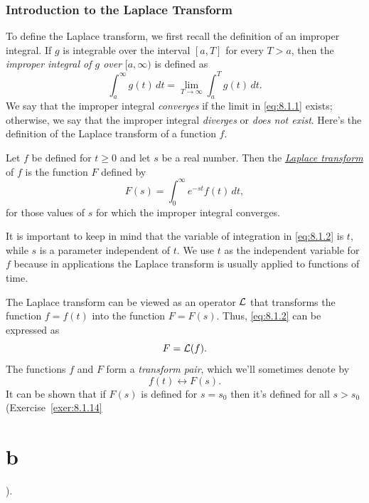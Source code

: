 \section{Introduction to the Laplace Transform}

\noindent
{}

\noindent
To define the Laplace transform, we first recall the definition of an improper integral. If $g$ is
integrable over the interval $[a,T]$ for every $T>a$, then the {\color{blue}\it improper integral of
$g$ over\/} $[a,\infty)$ is defined as
\begin{equation}
  \label{eq:8.1.1}\int^{\infty}_{a}g(t)\,dt=\lim_{T\to\infty}\int^{T}_{a}g(t)\,dt.
\end{equation}
We say that the improper integral {\color{blue}\it converges\/} if the limit in \eqref{eq:8.1.1}
exists; otherwise, we say that the improper integral {\color{blue}\it diverges\/} or
{\color{blue}\it does not exist\/}. Here's the definition of the Laplace transform of a function
$f$.

\begin{definition}
  \color{blue}
  \label{thmtype:8.1.1}\rm Let $f$ be defined for $t\ge0$ and let $s$ be a real number. Then the
  \href{https://mathshistory.st-andrews.ac.uk/Biographies/Laplace/}{\color{blue}
  \it Laplace transform} of $f$ is the function $F$ defined by
  \begin{equation}
    \label{eq:8.1.2}F(s)=\int_{0}^{\infty}e^{-st}f(t)\,dt,
  \end{equation}
  for those values of $s$ for which the improper integral converges.
\end{definition}

It is important to keep in mind that the variable of integration in \eqref{eq:8.1.2} is $t$, while
$s$ is a parameter independent of $t$. We use $t$ as the independent variable for $f$ because in
applications the Laplace transform is usually applied to functions of time.

The Laplace transform can be viewed as an operator ${\cal L}$ that transforms the function $f=f(t)$
into the function $F=F(s)$. Thus, \eqref{eq:8.1.2} can be expressed as
\[
  F={\cal L}(f).
\]
The functions $f$ and $F$ form a {\color{blue}\it transform pair\/}, which we'll sometimes denote by
\[
  f(t)\leftrightarrow F(s).
\]
It can be shown that if $F(s)$ is defined for $s=s_{0}$ then it's defined for all $s>s_{0}$
(Exercise~\ref{exer:8.1.14}\part{b}).

